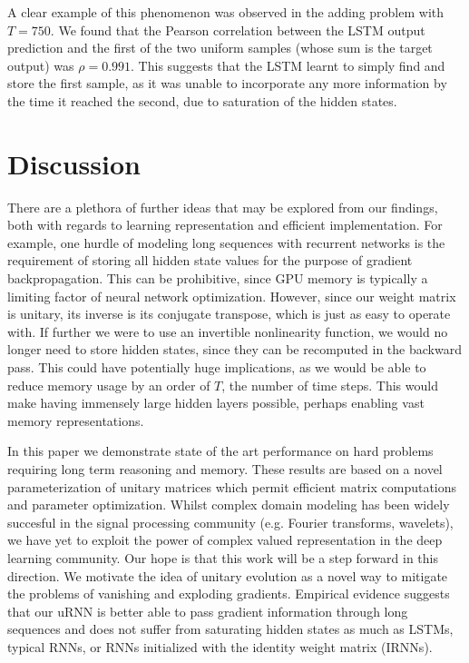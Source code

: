 \documentclass{article} %
\begin{document}
A clear example of this phenomenon was observed in the adding problem with $T=750$. We found that the 
Pearson correlation between the LSTM output prediction and the first of the two uniform samples (whose 
sum is the target output) was $\rho = 0.991$. This suggests that the LSTM learnt to simply find and store the 
first sample, as it was unable to 
incorporate any more information by the time it reached the second, due to 
saturation of the hidden states.   


\section{Discussion}

There are a plethora of further ideas that may be explored from our findings, both with regards to 
learning representation and efficient implementation. For example, one hurdle of modeling long sequences 
with recurrent networks is the requirement of storing all hidden state values for the purpose of gradient
backpropagation. This can be prohibitive, since GPU memory is typically a limiting factor of neural network 
optimization. However, since our weight matrix is unitary, its inverse is its conjugate transpose, 
which is just as easy to operate with. If further we were to use an invertible nonlinearity function, we would 
no longer need to store hidden states, since they can be recomputed in the backward pass. This could have 
potentially huge implications, as we would be able to reduce memory usage by an order of $T$, the number of
time steps. This would make having immensely large hidden layers possible, perhaps enabling vast memory representations.

In this paper we demonstrate state of the art performance on hard problems requiring
long term reasoning and memory. These results are based on a novel parameterization of unitary matrices which permit
efficient matrix computations and parameter optimization. Whilst complex domain modeling has been 
widely succesful in the signal processing community (e.g. Fourier transforms, wavelets), we have yet to 
exploit the power of complex valued representation in the deep learning community. Our hope is that this
work will be a step forward in this direction. We motivate the idea of unitary evolution as a novel way
to mitigate the problems of vanishing and exploding gradients. Empirical evidence suggests that our uRNN is better able
to pass gradient information through long sequences and does not suffer from saturating hidden states as much
as LSTMs, typical RNNs, or RNNs initialized with the identity weight matrix (IRNNs).
\end{document}
